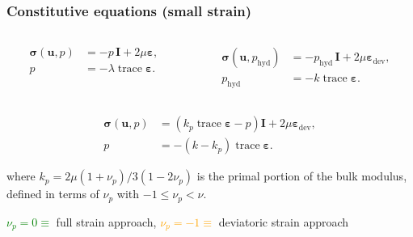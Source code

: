 \documentclass{beamer}
\newcommand{\bm}{\boldsymbol}
\newcommand\bI{\bm I}
\newcommand\bulk{k}
\newcommand\firstlame{\mathsf{\lambda}}
\newcommand\trace{\operatorname{trace}}
\begin{document}
\begin{frame}
	\frametitle{Constitutive equations (small strain)}
	\begin{columns}
		\begin{column}{0.5\textwidth}
				\begin{tcolorbox}[colback=green!5!white,colframe=green!50!black,title=Full strain approach]
					\begin{equation}\label{eq:mixed-linear-constitutive1}
						\begin{split}
							\bm \sigma(\bm u, p) &= -p \, \bI + 2 \mu \bm \varepsilon, \\ \nonumber
							p &= - \firstlame \trace \bm \varepsilon.
						\end{split}
					\end{equation}
				\end{tcolorbox}
		\end{column}
		\begin{column}{0.5\textwidth}
				\begin{tcolorbox}[colback=orange!5!white,colframe=orange!50!black,title=Deviatoric strain approach:]
					\begin{equation}\label{eq:mixed-linear-constitutive2}
						\begin{split}
							\bm \sigma(\bm u, p_{\text{hyd}}) &= -p_{\text{hyd}} \, \bI + 2 \mu \bm \varepsilon_{\text{dev}}, \\ \nonumber
							p_{\text{hyd}} &= -\bulk \trace \bm \varepsilon.
						\end{split}
					\end{equation}
				\end{tcolorbox}
		\end{column}
	\end{columns}
	\begin{tcolorbox}[title=Genral mixed constitutive equation:]
		\begin{equation}
			\begin{split}
				\bm \sigma(\bm u, p) &= \left(\bulk_p \trace \bm \varepsilon -p \right) \bI + 2 \mu \bm \varepsilon_{\text{dev}}, \\ \nonumber
				p &= -\left(\bulk - \bulk_p \right) \trace \bm \varepsilon.
			\end{split}
		\end{equation}
	\end{tcolorbox}
	\small{where $\bulk_p = 2 \mu \left(1 + \nu_p \right) / 3 \left(1 - 2 \nu_p \right)$ is the primal portion of the bulk modulus, defined in terms of \alert{$\nu_p$ with $-1 \leq \nu_p < \nu$}.}
	
	\vspace{3mm}
	\textcolor{green}{$\nu_p = 0 \equiv $} full strain approach, \qquad \textcolor{orange}{$\nu_p = -1 \equiv $} deviatoric strain approach
\end{frame}
\end{document}
